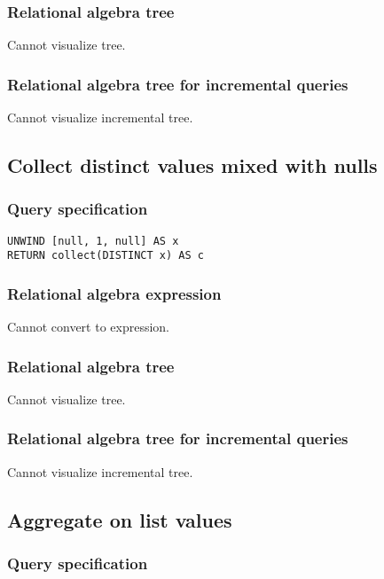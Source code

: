 \subsubsection*{Relational algebra tree}

Cannot visualize tree.

\subsubsection*{Relational algebra tree for incremental queries}

Cannot visualize incremental tree.

\subsection{Collect distinct values mixed with nulls}

\subsubsection*{Query specification}

\begin{lstlisting}
UNWIND [null, 1, null] AS x
RETURN collect(DISTINCT x) AS c
\end{lstlisting}

\subsubsection*{Relational algebra expression}

Cannot convert to expression.

\subsubsection*{Relational algebra tree}

Cannot visualize tree.

\subsubsection*{Relational algebra tree for incremental queries}

Cannot visualize incremental tree.

\subsection{Aggregate on list values}

\subsubsection*{Query specification}

